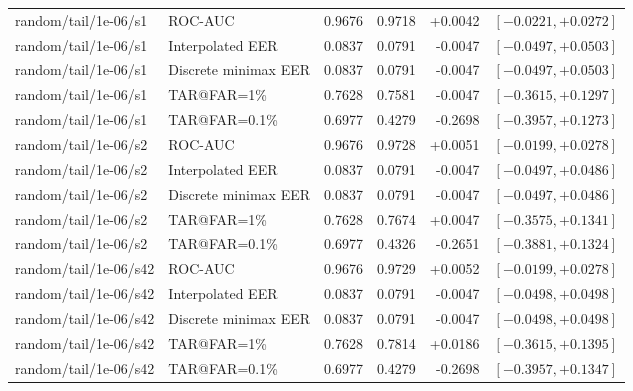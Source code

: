 \begin{table}[!t]
\begin{tabular}{@{}llrrrr@{}}
random/tail/1e-06/s1 & ROC-AUC & 0.9676 & 0.9718 & +0.0042 & $[-0.0221,+0.0272]$ \\
random/tail/1e-06/s1 & Interpolated EER & 0.0837 & 0.0791 & -0.0047 & $[-0.0497,+0.0503]$ \\
random/tail/1e-06/s1 & Discrete minimax EER & 0.0837 & 0.0791 & -0.0047 & $[-0.0497,+0.0503]$ \\
random/tail/1e-06/s1 & TAR@FAR=1\% & 0.7628 & 0.7581 & -0.0047 & $[-0.3615,+0.1297]$ \\
random/tail/1e-06/s1 & TAR@FAR=0.1\% & 0.6977 & 0.4279 & -0.2698 & $[-0.3957,+0.1273]$ \\
random/tail/1e-06/s2 & ROC-AUC & 0.9676 & 0.9728 & +0.0051 & $[-0.0199,+0.0278]$ \\
random/tail/1e-06/s2 & Interpolated EER & 0.0837 & 0.0791 & -0.0047 & $[-0.0497,+0.0486]$ \\
random/tail/1e-06/s2 & Discrete minimax EER & 0.0837 & 0.0791 & -0.0047 & $[-0.0497,+0.0486]$ \\
random/tail/1e-06/s2 & TAR@FAR=1\% & 0.7628 & 0.7674 & +0.0047 & $[-0.3575,+0.1341]$ \\
random/tail/1e-06/s2 & TAR@FAR=0.1\% & 0.6977 & 0.4326 & -0.2651 & $[-0.3881,+0.1324]$ \\
random/tail/1e-06/s42 & ROC-AUC & 0.9676 & 0.9729 & +0.0052 & $[-0.0199,+0.0278]$ \\
random/tail/1e-06/s42 & Interpolated EER & 0.0837 & 0.0791 & -0.0047 & $[-0.0498,+0.0498]$ \\
random/tail/1e-06/s42 & Discrete minimax EER & 0.0837 & 0.0791 & -0.0047 & $[-0.0498,+0.0498]$ \\
random/tail/1e-06/s42 & TAR@FAR=1\% & 0.7628 & 0.7814 & +0.0186 & $[-0.3615,+0.1395]$ \\
random/tail/1e-06/s42 & TAR@FAR=0.1\% & 0.6977 & 0.4279 & -0.2698 & $[-0.3957,+0.1347]$ \\
\bottomrule
\end{tabular}
\end{table}
